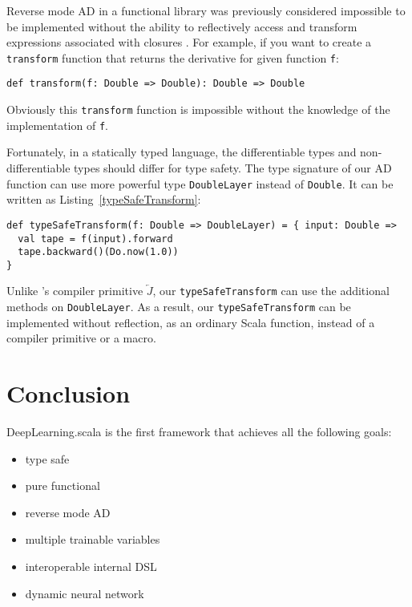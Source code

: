 Reverse mode AD in a functional library was previously considered impossible to be implemented without the ability to reflectively access and transform expressions associated with closures \cite{pearlmutter2008reverse}. For example, if you want to create a \lstinline{transform} function that returns the derivative for given function \lstinline{f}:

\begin{lstlisting}[float={h t b p},caption={Impossible transform function for AD}, label={transform}]
def transform(f: Double => Double): Double => Double
\end{lstlisting}

Obviously this \lstinline{transform} function is impossible without the knowledge of the implementation of \lstinline{f}.

Fortunately, in a statically typed language, the differentiable types and non-differentiable types should differ for type safety. The type signature of our AD function can use more powerful type \lstinline{DoubleLayer} instead of \lstinline{Double}. It can be written as Listing~\ref{typeSafeTransform}:

\begin{lstlisting}[float={h t b p},caption={Type safe transform function for AD}, label={typeSafeTransform}]
def typeSafeTransform(f: Double => DoubleLayer) = { input: Double =>
  val tape = f(input).forward
  tape.backward()(Do.now(1.0))
}
\end{lstlisting}

Unlike \cite{pearlmutter2008reverse}'s compiler primitive $\overleftarrow{J}$, our \lstinline{typeSafeTransform} can use the additional methods on \lstinline{DoubleLayer}. As a result, our \lstinline{typeSafeTransform} can be implemented without reflection, as an ordinary Scala function, instead of a compiler primitive or a macro.

\section{Conclusion}

DeepLearning.scala is the first framework that achieves all the following goals:

\begin{itemize}
  \item type safe
  \item pure functional
  \item reverse mode AD
  \item multiple \glspl{trainable variable}
  \item interoperable internal DSL
  \item dynamic neural network
\end{itemize}

